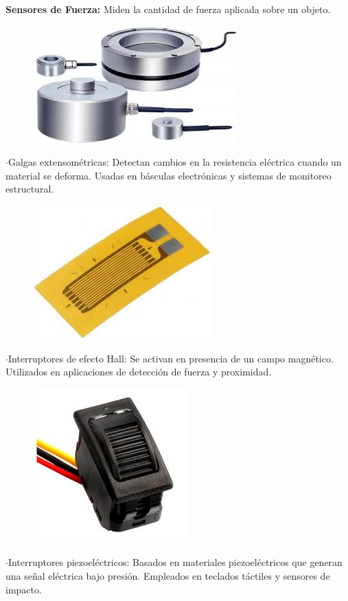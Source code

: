 \textbf{Sensores de Fuerza:}
	Miden la cantidad de fuerza aplicada sobre un objeto.

\begin{figure} [h]
	\centering
	\includegraphics[width=0.3\linewidth]{img/sensorfuerza}
	\caption{}
	\label{fig:sensorfuerza}
\end{figure}


	$\cdot$Galgas extensométricas: Detectan cambios en la resistencia eléctrica cuando un material se deforma. Usadas en básculas electrónicas y sistemas de monitoreo estructural.


\begin{figure} [h]
	\centering
	\includegraphics[width=0.3\linewidth]{img/galgasextensiometricas}
	\caption{}
	\label{fig:galgasextensiometricas}
\end{figure}

\newpage
	$\cdot$Interruptores de efecto Hall: Se activan en presencia de un campo magnético. Utilizados en aplicaciones de detección de fuerza y proximidad.


\begin{figure} [h]
	\centering
	\includegraphics[width=0.3\linewidth]{img/interruptorhall}
	\caption{}
	\label{fig:interruptorhall}
\end{figure}


	$\cdot$Interruptores piezoeléctricos: Basados en materiales piezoeléctricos que generan una señal eléctrica bajo presión. Empleados en teclados táctiles y sensores de impacto.


